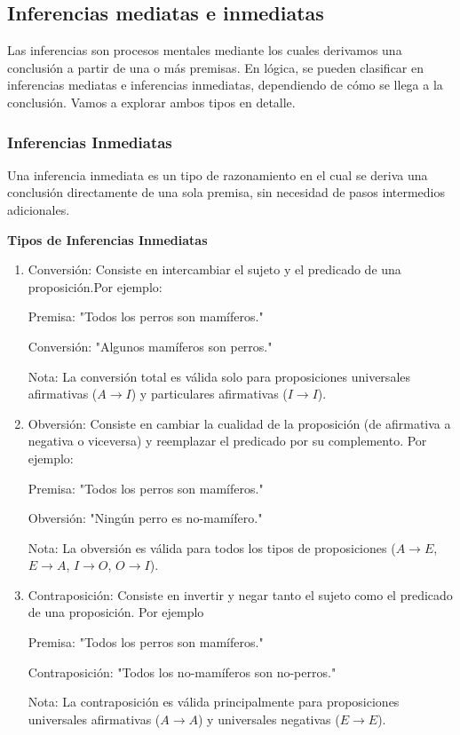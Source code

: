\subsection{Inferencias mediatas e inmediatas}

Las inferencias son procesos mentales mediante los cuales derivamos una conclusión a partir de una o más premisas. En lógica, se pueden clasificar en inferencias mediatas e inferencias inmediatas, dependiendo de cómo se llega a la conclusión. Vamos a explorar ambos tipos en detalle.

\subsubsection{Inferencias Inmediatas}

Una inferencia inmediata es un tipo de razonamiento en el cual se deriva una conclusión directamente de una sola premisa, sin necesidad de pasos intermedios adicionales.

\textbf{Tipos de Inferencias Inmediatas}

\begin{enumerate}
   \item Conversión: Consiste en intercambiar el sujeto y el predicado de una proposición.Por ejemplo:
         
         Premisa: "Todos los perros son mamíferos."
         
         Conversión: "Algunos mamíferos son perros."
         
         Nota: La conversión total es válida solo para proposiciones universales afirmativas (\( A \rightarrow I \)) y particulares afirmativas (\( I \rightarrow I \)).
         
   \item Obversión: Consiste en cambiar la cualidad de la proposición (de afirmativa a negativa o viceversa) y reemplazar el predicado por su complemento. Por ejemplo:
         
         Premisa: "Todos los perros son mamíferos."
         
         Obversión: "Ningún perro es no-mamífero."
         
         Nota: La obversión es válida para todos los tipos de proposiciones (\( A \rightarrow E \), \( E \rightarrow A \), \( I \rightarrow O \), \( O \rightarrow I \)).
         
   \item Contraposición: Consiste en invertir y negar tanto el sujeto como el predicado de una proposición. Por ejemplo
         
         Premisa: "Todos los perros son mamíferos."
         
         Contraposición: "Todos los no-mamíferos son no-perros."
         
         Nota: La contraposición es válida principalmente para proposiciones universales afirmativas (\( A \rightarrow A \)) y universales negativas (\( E \rightarrow E \)).
         
\end{enumerate}

